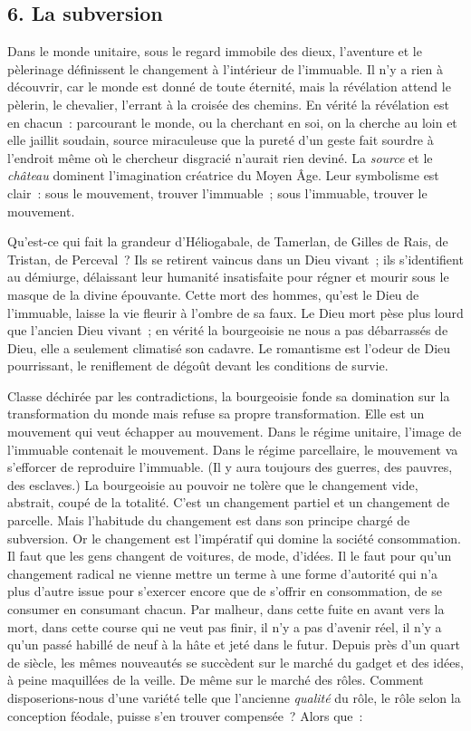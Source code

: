 \documentclass[french,twoside]{book} %
\begin{document}
\subsection[{6. La subversion}]{\textsc{6.} La subversion}
\noindent Dans le monde unitaire, sous le regard immobile des dieux, l’aventure et le pèlerinage définissent le changement à l’intérieur de l’immuable. Il n’y a rien à découvrir, car le monde est donné de toute éternité, mais la révélation attend le pèlerin, le chevalier, l’errant à la croisée des chemins. En vérité la révélation est en chacun : parcourant le monde, ou la cherchant en soi, on la cherche au loin et elle jaillit soudain, source miraculeuse que la pureté d’un geste fait sourdre à l’endroit même où le chercheur disgracié n’aurait rien deviné. La \emph{source} et le \emph{château} dominent l’imagination créatrice du Moyen Âge. Leur symbolisme est clair : sous le mouvement, trouver l’immuable ; sous l’immuable, trouver le mouvement.\par
Qu’est-ce qui fait la grandeur d’Héliogabale, de Tamerlan, de Gilles de Rais, de Tristan, de Perceval ? Ils se retirent vaincus dans un Dieu vivant ; ils s’identifient au démiurge, délaissant leur humanité insatisfaite pour régner et mourir sous le masque de la divine épouvante. Cette mort des hommes, qu’est le Dieu de l’immuable, laisse la vie fleurir à l’ombre de sa faux. Le Dieu mort pèse plus lourd que l’ancien Dieu vivant ; en vérité la bourgeoisie ne nous a pas débarrassés de Dieu, elle a seulement climatisé son cadavre. Le romantisme est l’odeur de Dieu pourrissant, le reniflement de dégoût devant les conditions de survie.\par
Classe déchirée par les contradictions, la bourgeoisie fonde sa domination sur la transformation du monde mais refuse sa propre transformation. Elle est un mouvement qui veut échapper au mouvement. Dans le régime unitaire, l’image de l’immuable contenait le mouvement. Dans le régime parcellaire, le mouvement va s’efforcer de reproduire l’immuable. (Il y aura toujours des guerres, des pauvres, des esclaves.) La bourgeoisie au pouvoir ne tolère que le changement vide, abstrait, coupé de la totalité. C’est un changement partiel et un changement de parcelle. Mais l’habitude du changement est dans son principe chargé de subversion. Or le changement est l’impératif qui domine la société consommation. Il faut que les gens changent de voitures, de mode, d’idées. Il le faut pour qu’un changement radical ne vienne mettre un terme à une forme d’autorité qui n’a plus d’autre issue pour s’exercer encore que de s’offrir en consommation, de se consumer en consumant chacun. Par malheur, dans cette fuite en avant vers la mort, dans cette course qui ne veut pas finir, il n’y a pas d’avenir réel, il n’y a qu’un passé habillé de neuf à la hâte et jeté dans le futur. Depuis près d’un quart de siècle, les mêmes nouveautés se succèdent sur le marché du gadget et des idées, à peine maquillées de la veille. De même sur le marché des rôles. Comment disposerions-nous d’une variété telle que l’ancienne \emph{qualité} du rôle, le rôle selon la conception féodale, puisse s’en trouver compensée ? Alors que :\par
\end{document}
